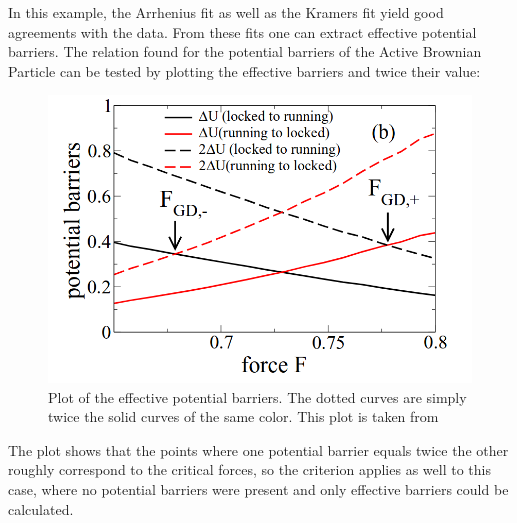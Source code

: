 \documentclass[12pt,a4paper]{article}
\begin{document}
In this example, the Arrhenius fit as well as the Kramers fit yield good agreements with the data. From these fits one can extract effective potential barriers. The relation found for the potential barriers of the Active Brownian Particle can be tested by plotting the effective barriers and twice their value:
\begin{figure}[H]	\includegraphics[scale=0.5]{barrierplot.png}\caption{Plot of the effective potential barriers. The dotted curves are simply twice the solid curves of the same color. This plot is taken from \cite{bpp}}
\end{figure}
The plot shows that the points where one potential barrier equals twice the other roughly correspond to the critical forces, so the criterion applies as well to this case, where no potential barriers were present and only effective barriers could be calculated.
\end{document}

